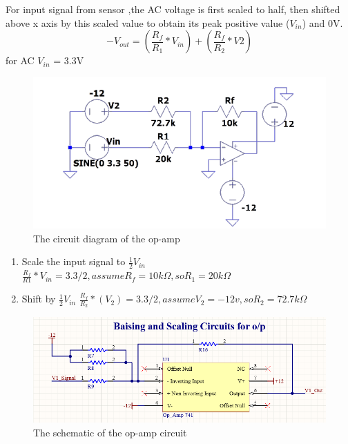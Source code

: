 \documentclass[12pt,a4paper]{book}
\begin{document}
For input signal from sensor ,the AC voltage is first scaled to half, then shifted above x axis by this scaled value to obtain its peak positive value (\(V_{in}\)) and 0V.
\begin{equation}
  -V_{out}=\left(\frac{R_{f}}{R_{1}}\ast V_{in}\right)+\left(\frac{R_{f}}{R_{2}}\ast V2\right)
  \label{equation:eq46}
\end{equation}
for AC \(V_{in}\) = 3.3V
\begin{figure}[h!]
  \centering
  \includegraphics[width = 14cm]{image37.png}
  \caption{The circuit diagram of the op-amp}
  \label{fig:image37}
\end{figure}
\begin{enumerate}
  \item Scale the input signal to \(\frac{1}{2}V_{in}\)
  \newline\(\frac{R_{f}}{R1}\ast V_{in}=3.3/2,   assume R_{f} =10k\Omega , so R_{1} =20k\Omega\)
  \item Shift by \(\frac{1}{2}V_{in}\)
  \newline\(\frac{R_{f}}{R_{2}}\ast(V_{2})=3.3/2  ,assume V_{2} =-12v , so R_{2} = 72.7k\Omega\)
\end{enumerate}
\begin{figure}[h!]
  \centering
  \includegraphics[width = 16cm]{image39.png}
  \caption{The schematic of the op-amp circuit}
  \label{fig:image39}
\end{figure}
\end{document}
